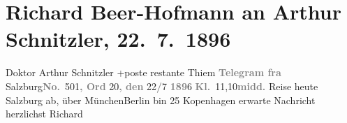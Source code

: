 

         
         \renewcommand{\erwaehntePersonen}{Personen: Richard Beer-Hofmann}
         \renewcommand{\erwaehnteOrte}{Orte: Berlin, Kopenhagen, München, Salzburg, Trondheim}
         \renewcommand{\erwaehnteWerke}{}
               \section[Richard Beer-Hofmann an Arthur Schnitzler, 22. 7. 1896]{ Richard Beer-Hofmann an Arthur Schnitzler, 22. 7. 1896}\nopagebreak{}\rehead{ }\begin{ledgroupsized}[t]{13cm}\normalsize\beginnumbering \toendnotes[C]{\smallbreak\pagebreak[2]} 
\pstart{}{\pb}Doktor Arthur Schnitzler
                  +\pend{}\pstart{}poste restante Thiem\pend{}{\bigskip}\pstart
           \noindent{}{\pb}\textcolor{gray}{\textbf{Telegram fra}}{ }Salzburg\textcolor{gray}{\textbf{No.}} 501\textcolor{gray}{\textbf{, Ord}} 20\textcolor{gray}{\textbf{, den}}{ }22\textcolor{gray}{\textbf{/}}7{ }\textcolor{gray}{\textbf{189}}6{ }\textcolor{gray}{\textbf{Kl.}} 11,10\textcolor{gray}{\textbf{midd.}}\pend
           \pstart
           Reise heute Salzburg ab, über MünchenBerlin bin 25{ }Kopenhagen erwarte Nachricht herzlichst\pend
           \pstart \spacefill\mbox{Richard}\pend{}
         
         \endnumbering{}\end{ledgroupsized}  \newcommand{\dateiname}{L00566}\newcommand{\titel}{Richard Beer-Hofmann an Arthur Schnitzler, 22. 7. 1896}\newcommand{\editorInnen}{Martin Anton Müller und Gerd-Hermann Susen}
      